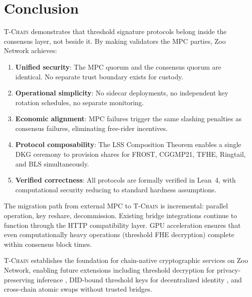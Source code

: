 \documentclass[11pt,letterpaper]{article}
\theoremstyle{definition}
\theoremstyle{remark}
\newcommand{\TChain}{\textsc{T-Chain}}
\newcommand{\LSS}{\textsc{LSS}}
\begin{document}
\section{Conclusion}
\label{sec:conclusion}

\TChain{} demonstrates that threshold signature protocols belong inside the consensus layer, not beside it. By making validators the MPC parties, Zoo Network achieves:

\begin{enumerate}
\item \textbf{Unified security}: The MPC quorum and the consensus quorum are identical. No separate trust boundary exists for custody.
\item \textbf{Operational simplicity}: No sidecar deployments, no independent key rotation schedules, no separate monitoring.
\item \textbf{Economic alignment}: MPC failures trigger the same slashing penalties as consensus failures, eliminating free-rider incentives.
\item \textbf{Protocol composability}: The \LSS{} Composition Theorem enables a single DKG ceremony to provision shares for FROST, CGGMP21, TFHE, Ringtail, and BLS simultaneously.
\item \textbf{Verified correctness}: All protocols are formally verified in Lean~4, with computational security reducing to standard hardness assumptions.
\end{enumerate}

The migration path from external MPC to \TChain{} is incremental: parallel operation, key reshare, decommission. Existing bridge integrations continue to function through the HTTP compatibility layer. GPU acceleration ensures that even computationally heavy operations (threshold FHE decryption) complete within consensus block times.

\TChain{} establishes the foundation for chain-native cryptographic services on Zoo Network, enabling future extensions including threshold decryption for privacy-preserving inference \cite{zoo-fhe}, DID-bound threshold keys for decentralized identity \cite{zoo-identity-chain}, and cross-chain atomic swaps without trusted bridges.
\end{document}
